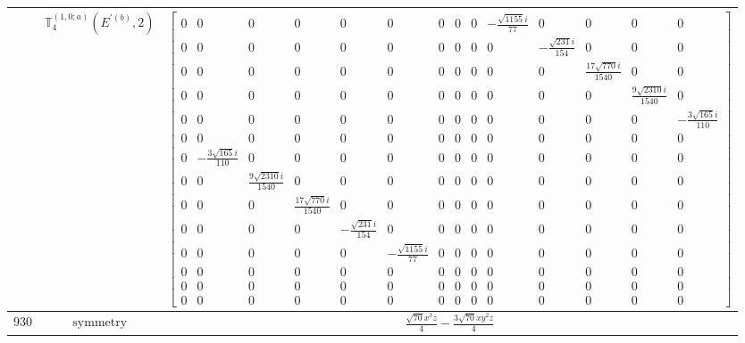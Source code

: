\documentclass[fleqn,8pt,landscape]{jsarticle}
\begin{document}
\begin{longtable}{ccc}
$  $ & $ \mathbb{T}_{4}^{(1,0;a)}(E^{\prime(b)},2) $ & $ \begin{bmatrix} 0 & 0 & 0 & 0 & 0 & 0 & 0 & 0 & 0 & - \frac{\sqrt{1155} i}{77} & 0 & 0 & 0 & 0 \\ 0 & 0 & 0 & 0 & 0 & 0 & 0 & 0 & 0 & 0 & - \frac{\sqrt{231} i}{154} & 0 & 0 & 0 \\ 0 & 0 & 0 & 0 & 0 & 0 & 0 & 0 & 0 & 0 & 0 & \frac{17 \sqrt{770} i}{1540} & 0 & 0 \\ 0 & 0 & 0 & 0 & 0 & 0 & 0 & 0 & 0 & 0 & 0 & 0 & \frac{9 \sqrt{2310} i}{1540} & 0 \\ 0 & 0 & 0 & 0 & 0 & 0 & 0 & 0 & 0 & 0 & 0 & 0 & 0 & - \frac{3 \sqrt{165} i}{110} \\ 0 & 0 & 0 & 0 & 0 & 0 & 0 & 0 & 0 & 0 & 0 & 0 & 0 & 0 \\ 0 & - \frac{3 \sqrt{165} i}{110} & 0 & 0 & 0 & 0 & 0 & 0 & 0 & 0 & 0 & 0 & 0 & 0 \\ 0 & 0 & \frac{9 \sqrt{2310} i}{1540} & 0 & 0 & 0 & 0 & 0 & 0 & 0 & 0 & 0 & 0 & 0 \\ 0 & 0 & 0 & \frac{17 \sqrt{770} i}{1540} & 0 & 0 & 0 & 0 & 0 & 0 & 0 & 0 & 0 & 0 \\ 0 & 0 & 0 & 0 & - \frac{\sqrt{231} i}{154} & 0 & 0 & 0 & 0 & 0 & 0 & 0 & 0 & 0 \\ 0 & 0 & 0 & 0 & 0 & - \frac{\sqrt{1155} i}{77} & 0 & 0 & 0 & 0 & 0 & 0 & 0 & 0 \\ 0 & 0 & 0 & 0 & 0 & 0 & 0 & 0 & 0 & 0 & 0 & 0 & 0 & 0 \\ 0 & 0 & 0 & 0 & 0 & 0 & 0 & 0 & 0 & 0 & 0 & 0 & 0 & 0 \\ 0 & 0 & 0 & 0 & 0 & 0 & 0 & 0 & 0 & 0 & 0 & 0 & 0 & 0 \end{bmatrix} $ \\ \hline
$ 930 $ & $ \text{symmetry} $ & $ \frac{\sqrt{70} x^{3} z}{4} - \frac{3 \sqrt{70} x y^{2} z}{4} $ \\

\end{longtable}
\end{document}
